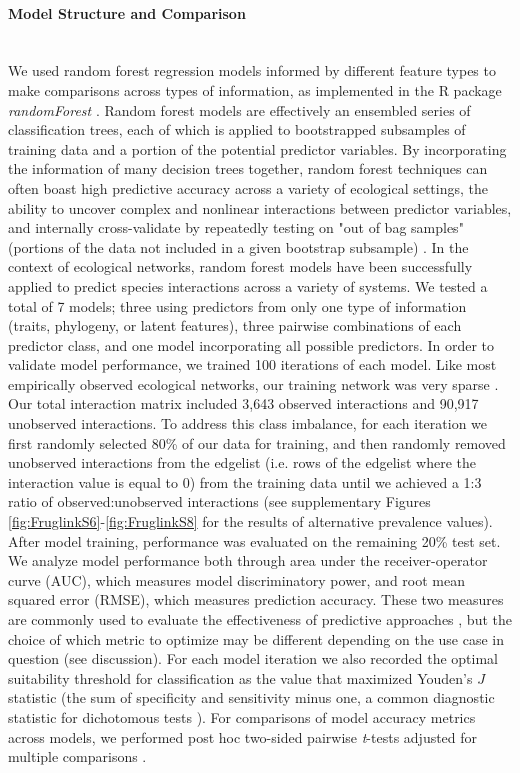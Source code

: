 \paragraph{Model Structure and Comparison}\mbox{}\\ 
    We used random forest regression models informed by different feature types to make comparisons across types of information, as implemented in the R package \textit{randomForest} \parencite{randomForest}. Random forest models are effectively an ensembled series of classification trees, each of which is applied to bootstrapped subsamples of training data and a portion of the potential predictor variables. By incorporating the information of many decision trees together, random forest techniques can often boast high predictive accuracy across a variety of ecological settings, the ability to uncover complex and nonlinear interactions between predictor variables, and internally cross-validate by repeatedly testing on "out of bag samples" (portions of the data not included in a given bootstrap subsample) \parencite{breiman2001random,cutler2007random}. In the context of ecological networks, random forest models have been successfully applied to predict species interactions across a variety of systems. \parencite{desjardins2017ecological, pichler2020, sydenham2022metacomnet} We tested a total of 7 models; three using predictors from only one type of information (traits, phylogeny, or latent features), three pairwise combinations of each predictor class, and one model incorporating all possible predictors. In order to validate model performance, we trained 100 iterations of each model. Like most empirically observed ecological networks, our training network was very sparse \parencite{vazquez2009uniting}. Our total interaction matrix included 3,643 observed interactions and 90,917 unobserved interactions. To address this class imbalance, for each iteration we first randomly selected 80\% of our data for training, and then randomly removed unobserved interactions from the edgelist (i.e. rows of the edgelist where the interaction value is equal to 0) from the training data until we achieved a 1:3 ratio of observed:unobserved interactions (see supplementary Figures \ref{fig:FruglinkS6}-\ref{fig:FruglinkS8} for the results of alternative prevalence values). After model training, performance was evaluated on the remaining 20\% test set. We analyze model performance both through area under the receiver-operator curve (AUC), which measures model discriminatory power, and root mean squared error (RMSE), which measures prediction accuracy. These two measures are commonly used to evaluate the effectiveness of predictive approaches \parencite{norberg2019comprehensive}, but the choice of which metric to optimize may be different depending on the use case in question (see discussion). For each model iteration we also recorded the optimal suitability threshold for classification as the value that maximized Youden's $J$ statistic (the sum of specificity and sensitivity minus one, a common diagnostic statistic for dichotomous tests \parencite{youden1950index}). For comparisons of model accuracy metrics across models, we performed post hoc two-sided pairwise \emph{t}-tests adjusted for multiple comparisons \parencite{holm1979simple}. 

